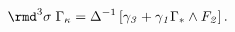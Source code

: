 \begin{equation}
\rmd^3\sigma \;  \Gamma _{\kappa }=\Delta ^{-1}\left[ \gamma _{\it
3}+\gamma _{\it 1} \Gamma
  _*\wedge F_{\it 2}\right].
 \label{Gammakappa}
\end{equation}

